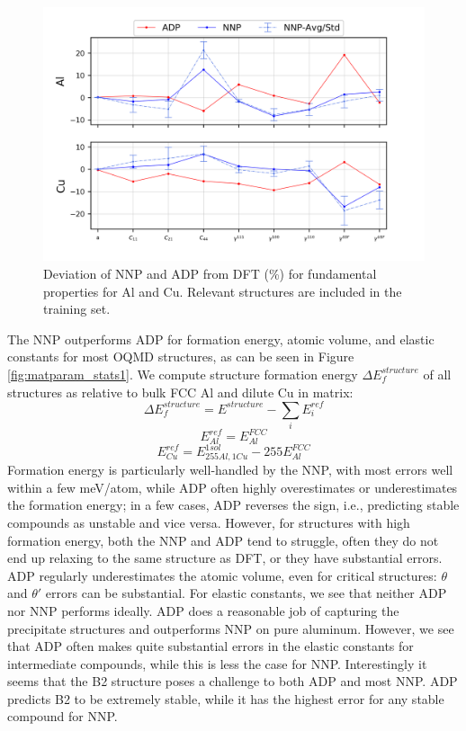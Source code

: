 \documentclass{article}
\begin{document}
\begin{figure}[H]%
\centering%
\includegraphics[width=1\textwidth,center]{./figures/matparam_purestats.png}%
\caption{Deviation of NNP and ADP from DFT (\%) for fundamental properties for Al and Cu. 
Relevant structures are included in the training set. }%
\label{fig:matparam_purestats}
\end{figure}
The NNP outperforms ADP for formation energy, atomic volume, and elastic constants for most OQMD structures, as can be seen in Figure \ref{fig:matparam_stats1}.
We compute structure formation energy $\Delta E^{structure}_f$ of all structures as relative to bulk FCC Al and dilute Cu in matrix:
\begin{equation} \label{eqn:formE_structure}
\Delta E^{structure}_f = E^{structure} - \sum_i E^{ref}_i
\end{equation}
\begin{equation} \label{eqn:formRef_Al}
E^{ref}_{Al} = E^{FCC}_{Al}
\end{equation}
\begin{equation} \label{eqn:formRef_Cu}
E^{ref}_{Cu} = E^{1sol}_{255Al,1Cu} - 255E^{FCC}_{Al}
\end{equation}
Formation energy is particularly well-handled by the NNP, with most errors well within a few meV/atom, while ADP often highly overestimates or underestimates the formation energy;
in a few cases, ADP reverses the sign, i.e., predicting stable compounds as unstable and vice versa.
However, for structures with high formation energy, both the NNP and ADP tend to struggle, often they do not end up relaxing to the same structure as DFT, or they have substantial errors.
ADP regularly underestimates the atomic volume, even for critical structures: $\theta$ and $\theta'$ errors can be substantial.
For elastic constants, we see that neither ADP nor NNP performs ideally.
ADP does a reasonable job of capturing the precipitate structures and outperforms NNP on pure aluminum.
However, we see that ADP often makes quite substantial errors in the elastic constants for intermediate compounds, while this is less the case for NNP. Interestingly it seems that the B2 structure poses a challenge to both ADP and most NNP.
ADP predicts B2 to be extremely stable, while it has the highest error for any stable compound for NNP. 
\end{document}

